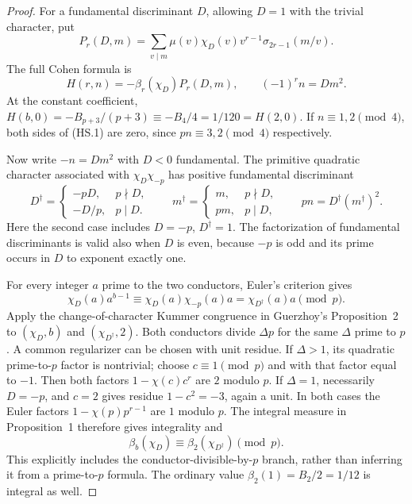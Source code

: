 \begin{proof}
For a fundamental discriminant $D$, allowing $D=1$ with the
trivial character, put
\[
 P_r(D,m)=\sum_{v\mid m}\mu(v)\chi_D(v)v^{r-1}
                                    \sigma_{2r-1}(m/v).
                                                               \tag{HS.2}
\]
The full Cohen formula is
\[
 H(r,n)=-\beta_r(\chi_D)P_r(D,m),
                  \qquad (-1)^rn=Dm^2.               \tag{HS.3}
\]
At the constant coefficient,
$H(b,0)=-B_{p+3}/(p+3)\equiv-B_4/4=1/120=H(2,0)$.
If $n\equiv1,2\pmod4$, both sides of (HS.1) are zero,
since $pn\equiv3,2\pmod4$ respectively.

Now write $-n=Dm^2$ with $D<0$ fundamental.  The primitive
quadratic character associated with $\chi_D\chi_{-p}$ has positive
fundamental discriminant
\[
 D^\dagger=
 \begin{cases}
  -pD,&p\nmid D,\\
  -D/p,&p\mid D.
 \end{cases}
 \qquad
 m^\dagger=
 \begin{cases}
  m,&p\nmid D,\\
  pm,&p\mid D,
 \end{cases}
 \qquad pn=D^\dagger(m^\dagger)^2.                    \tag{HS.4}
\]
Here the second case includes $D=-p$, $D^\dagger=1$.
The factorization of fundamental discriminants is valid also
when $D$ is even, because $-p$ is odd and its prime occurs in
$D$ to exponent exactly one.

For every integer $a$ prime to the two conductors,
Euler's criterion gives
\[
 \chi_D(a)a^{b-1}
       \equiv\chi_D(a)\chi_{-p}(a)a
       =\chi_{D^\dagger}(a)a\pmod p.                 \tag{HS.5}
\]
Apply the change-of-character Kummer congruence in Guerzhoy's
Proposition~2 to $(\chi_D,b)$ and $(\chi_{D^\dagger},2)$.
Both conductors divide $\Delta p$ for the same $\Delta$ prime to
$p$.  A common regularizer can be chosen with unit residue.
If $\Delta>1$, its quadratic prime-to-$p$ factor is nontrivial;
choose $c\equiv1\pmod p$ and with that factor equal to $-1$.
Then both factors $1-\chi(c)c^r$ are $2$ modulo $p$.
If $\Delta=1$, necessarily $D=-p$, and $c=2$ gives residue
$1-c^2=-3$, again a unit.  In both cases the Euler factors
$1-\chi(p)p^{r-1}$ are $1$ modulo $p$.
The integral measure in Proposition~1 therefore gives
integrality and
\[
                    \beta_b(\chi_D)
                    \equiv\beta_2(\chi_{D^\dagger})\pmod p.
                                                               \tag{HS.6}
\]
This explicitly includes the conductor-divisible-by-$p$ branch,
rather than inferring it from a prime-to-$p$ formula.
The ordinary value $\beta_2(1)=B_2/2=1/12$ is integral as well.


\end{proof}
